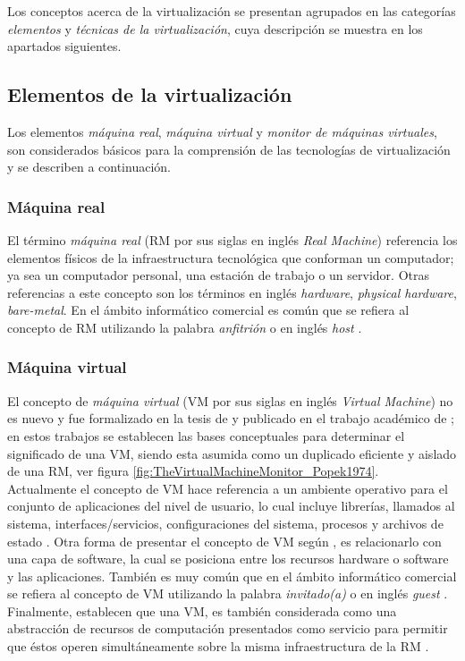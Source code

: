 Los conceptos acerca de la virtualización se presentan agrupados en las categorías \textit{elementos} y  \textit{técnicas de la virtualización}, cuya descripción se muestra en los apartados siguientes.\\


\subsection{Elementos de la virtualización}\label{sec:elementos}
\vspace{5mm}
Los elementos \textit{máquina real}, \textit{máquina virtual} y \textit{monitor de máquinas virtuales}, son considerados básicos para la comprensión de las tecnologías de virtualización y se describen a continuación.

\subsubsection{Máquina real}
\vspace{5mm}
El término \textit{máquina real} (RM por sus siglas en inglés \textit{Real Machine}) referencia los elementos físicos de la infraestructura tecnológica que conforman un computador; ya sea un computador personal, una estación de trabajo o un servidor. Otras referencias a este concepto son los términos en inglés \textit{hardware}, \textit{physical hardware}, \textit{bare-metal}. En el ámbito informático comercial es común que se refiera al concepto de RM utilizando la palabra \textit{anfitrión} o en inglés \textit{host} \parencite{VMware2008}. 

\subsubsection{Máquina virtual}
\vspace{5mm}
El concepto de \textit{máquina virtual} (VM por sus siglas en inglés \textit{Virtual Machine}) no es nuevo y fue formalizado en la tesis de  \textcite{Goldberg1973} y publicado en el trabajo académico de \textcite{Goldberg1974}; en estos trabajos se establecen las bases conceptuales para determinar el significado de una VM, siendo esta asumida como un duplicado eficiente y aislado de una RM, ver figura \ref{fig:TheVirtualMachineMonitor_Popek1974}.\\

Actualmente el concepto de VM hace referencia a un ambiente operativo para el conjunto de aplicaciones del nivel de usuario, lo cual incluye librerías, llamados al sistema, interfaces/servicios, configuraciones del sistema, procesos y archivos de estado \parencite{Chiueh2005}. Otra forma de presentar el concepto de VM según \textcite{Solis2014}, es relacionarlo con una capa de software, la cual se posiciona entre los recursos hardware o software y las aplicaciones. También es muy común que en el ámbito informático comercial se refiera al concepto de VM utilizando la palabra \textit{invitado(a)} o en inglés \textit{guest} \parencite{VMware2008}. Finalmente, \textcite{Pek2013} establecen que una VM, es también considerada como una abstracción de recursos de computación presentados como servicio para permitir que éstos operen simultáneamente sobre la misma infraestructura de la RM .

